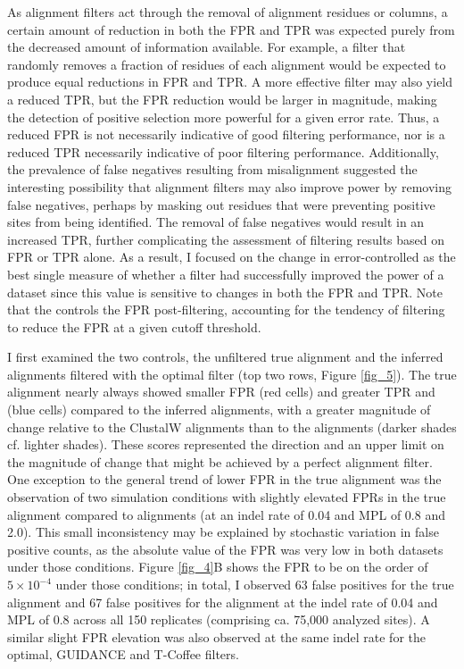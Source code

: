As alignment filters act through the removal of alignment residues or
columns, a certain amount of reduction in both the FPR and TPR was expected
purely from the decreased amount of information available. For
example, a filter that randomly removes a fraction of residues of each
alignment would be expected to produce equal reductions in FPR and
TPR. A more effective filter may also yield a reduced TPR, but the FPR
reduction would be larger in magnitude, making the detection of
positive selection more powerful for a given error rate. Thus, a
reduced FPR is not necessarily indicative of good filtering
performance, nor is a reduced TPR necessarily indicative of poor
filtering performance. Additionally, the prevalence of false negatives
resulting from misalignment suggested the interesting possibility that alignment filters may also
improve power by removing false negatives, perhaps by masking out
residues that were preventing positive sites from being
identified. The removal of false negatives would result in an
increased TPR, further complicating the assessment of filtering
results based on FPR or TPR alone. As a result, I focused on the
change in error-controlled \tpr{} as the best single measure of
whether a filter had successfully improved the \sw power of a dataset
since this value is sensitive to changes in both the FPR and TPR. Note
that the \tpr controls the FPR post-filtering, accounting for the
tendency of filtering to reduce the FPR at a given cutoff threshold.

I first examined the two controls, the unfiltered true alignment and
the inferred alignments filtered with the optimal filter (top two
rows, Figure \ref{fig_5}). The true alignment nearly always showed
smaller FPR (red cells) and greater TPR and \tpr (blue cells) compared
to the inferred alignments, with a greater magnitude of change
relative to the ClustalW alignments than to the \prankc alignments
(darker shades cf. lighter shades). These scores represented the
direction and an upper limit on the magnitude of change that might be
achieved by a perfect alignment filter. One exception to the general
trend of lower FPR in the true alignment was the observation of two
simulation conditions with slightly elevated FPRs in the true
alignment compared to \prankc alignments (at an indel rate of 0.04 and
MPL of 0.8 and 2.0). This small inconsistency may be explained by
stochastic variation in false positive counts, as the absolute value
of the FPR was very low in both datasets under those
conditions. Figure \ref{fig_4}B shows the FPR to be on the order of
$5\times10^{-4}$ under those conditions; in total, I observed 63
false positives for the true alignment and 67 false positives for the
\prankc alignment at the indel rate of 0.04 and MPL of 0.8 across all
150 replicates (comprising ca. 75,000 analyzed sites). A similar
slight FPR elevation was also observed at the same indel rate for the
optimal, GUIDANCE and T-Coffee filters.

